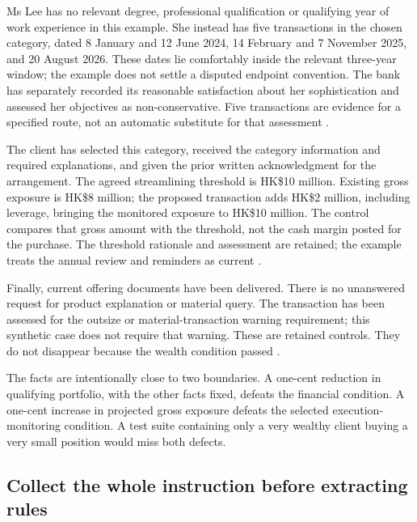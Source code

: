 \documentclass[12pt,a4paper,oneside,openany]{book}
\begin{document}
Ms Lee has no relevant degree, professional qualification or qualifying year of
work experience in this example. She instead has five transactions in the
chosen category, dated 8 January and 12 June 2024, 14 February and 7 November
2025, and 20 August 2026. These dates lie comfortably inside the relevant
three-year window; the example does not settle a disputed endpoint convention.
The bank has separately recorded its reasonable satisfaction about her
sophistication and assessed her objectives as non-conservative. Five transactions
are evidence for a specified route, not an automatic substitute for that
assessment \citep[Annex 1, paras.~4.1, 5.1, 7.3]{sfcspiannex1}.

The client has selected this category, received the category information and
required explanations, and given the prior written acknowledgment for the
arrangement. The agreed streamlining threshold is HK\$10 million. Existing
gross exposure is HK\$8 million; the proposed transaction adds HK\$2 million,
including leverage, bringing the monitored exposure to HK\$10 million. The
control compares that gross amount with the threshold, not the cash margin
posted for the purchase. The threshold rationale and assessment are retained;
the example treats the annual review and reminders as current
\citep[Annex 1, paras.~6--8, 12--14; Annex 2, FAQ~7]{sfcspiannex1,sfcspiannex2}.

Finally, current offering documents have been delivered. There is no unanswered
request for product explanation or material query. The transaction has been
assessed for the outsize or material-transaction warning requirement; this
synthetic case does not require that warning. These are retained controls.
They do not disappear because the wealth condition passed
\citep[Annex 1, paras.~8.4, 10.3]{sfcspiannex1}.

The facts are intentionally close to two boundaries. A one-cent reduction in
qualifying portfolio, with the other facts fixed, defeats the financial
condition. A one-cent increase in projected gross exposure defeats the selected
execution-monitoring condition. A test suite containing only a very wealthy
client buying a very small position would miss both defects.

\subsection{Collect the whole instruction before extracting rules}
\label{merge:P-01b-complete-dry-run:02}
\end{document}
